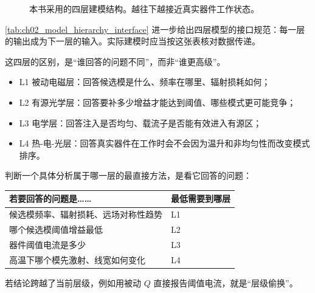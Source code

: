 \begin{figure}[htbp]
  \centering
  \caption{本书采用的四层建模结构。越往下越接近真实器件工作状态。}
  \label{fig:model_layers}
\end{figure}

\cref{tab:ch02_model_hierarchy_interface} 进一步给出四层模型的接口规范：每一层的输出成为下一层的输入。实际建模时应当按这张表核对数据传递。

\begin{table}[htbp]
  \centering
  \caption{PCSEL 四层建模体系的接口规范。以“计算阈值电流”为例说明数据如何在各层之间传递。每一层的输出成为下一层的输入。}
  \label{tab:ch02_model_hierarchy_interface}
  
\end{table}


这四层的区别，是“谁回答的问题不同”，而非“谁更高级”。

\begin{itemize}
  \item L1 被动电磁层：回答候选模是什么、频率在哪里、辐射损耗如何；
  \item L2 有源光学层：回答要补多少增益才能达到阈值、哪些模式更可能竞争；
  \item L3 电学层：回答注入是否均匀、载流子是否能有效进入有源区；
  \item L4 热-电-光层：回答真实器件在工作时会不会因为温升和非均匀性而改变模式排序。
\end{itemize}

\begin{IntuitionBox}
判断一个具体分析属于哪一层的最直接方法，是看它回答的问题：
\begin{center}
\begin{tabular}{@{}p{6.4cm}p{2.8cm}@{}}
\toprule
若要回答的问题是…… & 最低需要到哪层 \\
\midrule
候选模频率、辐射损耗、远场对称性趋势 & L1 \\
哪个候选模阈值增益最低 & L2 \\
器件阈值电流是多少 & L3 \\
高温下哪个模先激射、线宽如何变化 & L4 \\
\bottomrule
\end{tabular}
\end{center}
若结论跨越了当前层级，例如用被动 $Q$ 直接报告阈值电流，就是“层级偷换”。
\end{IntuitionBox}

